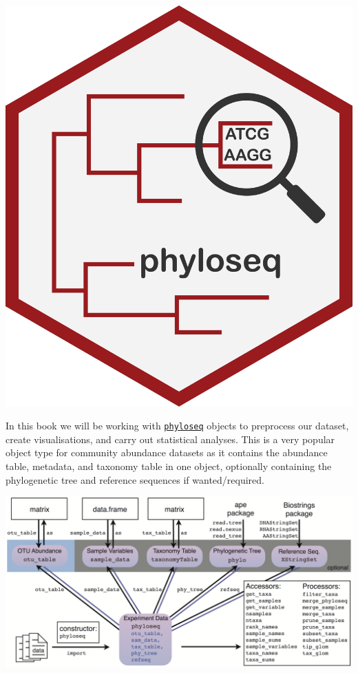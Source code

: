 \documentclass[
]{book}
\begin{document}
\includegraphics{figures/phyloseq_logo.png}

In this book we will be working with \href{https://joey711.github.io/phyloseq/}{\texttt{phyloseq}} objects to preprocess our dataset, create visualisations, and carry out statistical analyses. This is a very popular object type for community abundance datasets as it contains the abundance table, metadata, and taxonomy table in one object, optionally containing the phylogenetic tree and reference sequences if wanted/required.

\includegraphics{figures/phyloseq_input.png}
\end{document}
